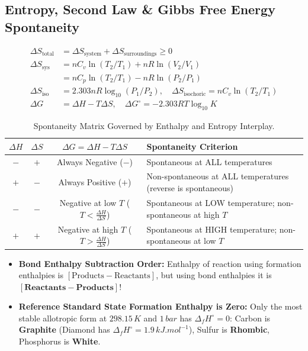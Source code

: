 \documentclass[10pt,twoside,openright]{book}
\begin{document}
\subsection{Entropy, Second Law \& Gibbs Free Energy Spontaneity}

\begin{formulabox}
\begin{align}
  \Delta S_{\text{total}} &= \Delta S_{\text{system}} + \Delta S_{\text{surroundings}} \ge 0 \\
  \Delta S_{\text{sys}} &= n C_v \ln(T_2/T_1) + n R \ln(V_2/V_1) \\
  &= n C_p \ln(T_2/T_1) - n R \ln(P_2/P_1) \\
  \Delta S_{\text{iso}} &= 2.303 n R \log_{10}(P_1/P_2), \quad \Delta S_{\text{isochoric}} = n C_v \ln(T_2/T_1) \\
  \Delta G &= \Delta H - T \Delta S, \quad \Delta G^\circ = -2.303 R T \log_{10} K
\end{align}
\end{formulabox}

\begin{table}[htbp]
\centering
\small
\renewcommand{\arraystretch}{1.2}
\begin{tabularx}{\textwidth}{c c c L}
\toprule
$\Delta H$ & $\Delta S$ & $\Delta G = \Delta H - T\Delta S$ & \textbf{Spontaneity Criterion} \\
\midrule
$-$ & $+$ & Always Negative ($-$) & Spontaneous at ALL temperatures \\
$+$ & $-$ & Always Positive ($+$) & Non-spontaneous at ALL temperatures (reverse is spontaneous) \\
$-$ & $-$ & Negative at low $T$ ($T < \frac{\Delta H}{\Delta S}$) & Spontaneous at LOW temperature; non-spontaneous at high $T$ \\
$+$ & $+$ & Negative at high $T$ ($T > \frac{\Delta H}{\Delta S}$) & Spontaneous at HIGH temperature; non-spontaneous at low $T$ \\
\bottomrule
\end{tabularx}
\caption{Spontaneity Matrix Governed by Enthalpy and Entropy Interplay.}
\end{table}

\begin{trapbox}
\begin{itemize}
  \item \textbf{Bond Enthalpy Subtraction Order:} Enthalpy of reaction using formation enthalpies is $[\text{Products} - \text{Reactants}]$, but using bond enthalpies it is $[\mathbf{Reactants} - \mathbf{Products}]$!
  \item \textbf{Reference Standard State Formation Enthalpy is Zero:} Only the most stable allotropic form at $298.15\,\si{K}$ and $1\,\si{bar}$ has $\Delta_f H^\circ = 0$: Carbon is \textbf{Graphite} (Diamond has $\Delta_f H^\circ = 1.9\,\si{kJ.mol^{-1}}$), Sulfur is \textbf{Rhombic}, Phosphorus is \textbf{White}.
\end{itemize}
\end{trapbox}
\end{document}

